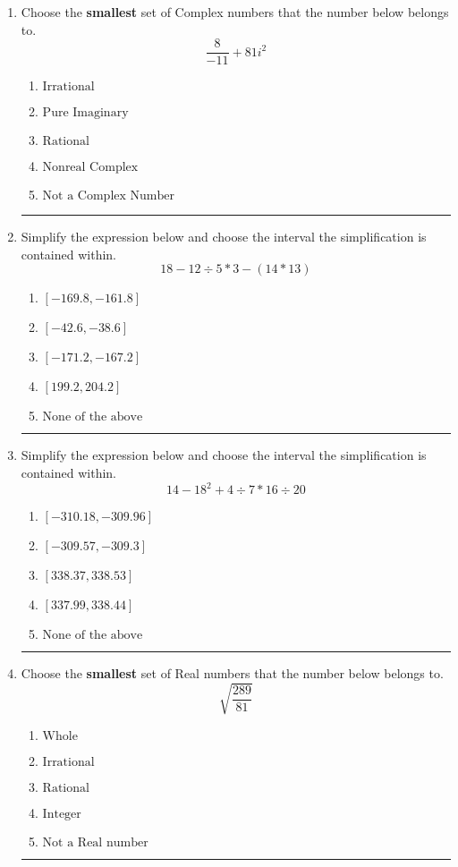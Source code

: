 \documentclass[14pt]{extbook}
\newcommand{\litem}[1]{\item#1\hspace*{-1cm}\rule{\textwidth}{0.4pt}}
\begin{document}
\begin{enumerate}
\litem{
Choose the \textbf{smallest} set of Complex numbers that the number below belongs to.\[ \frac{8}{-11}+81i^2 \]\begin{enumerate}[label=\Alph*.]
\item \( \text{Irrational} \)
\item \( \text{Pure Imaginary} \)
\item \( \text{Rational} \)
\item \( \text{Nonreal Complex} \)
\item \( \text{Not a Complex Number} \)

\end{enumerate} }
\litem{
Simplify the expression below and choose the interval the simplification is contained within.\[ 18 - 12 \div 5 * 3 - (14 * 13) \]\begin{enumerate}[label=\Alph*.]
\item \( [-169.8, -161.8] \)
\item \( [-42.6, -38.6] \)
\item \( [-171.2, -167.2] \)
\item \( [199.2, 204.2] \)
\item \( \text{None of the above} \)

\end{enumerate} }
\litem{
Simplify the expression below and choose the interval the simplification is contained within.\[ 14 - 18^2 + 4 \div 7 * 16 \div 20 \]\begin{enumerate}[label=\Alph*.]
\item \( [-310.18, -309.96] \)
\item \( [-309.57, -309.3] \)
\item \( [338.37, 338.53] \)
\item \( [337.99, 338.44] \)
\item \( \text{None of the above} \)

\end{enumerate} }
\litem{
Choose the \textbf{smallest} set of Real numbers that the number below belongs to.\[ \sqrt{\frac{289}{81}} \]\begin{enumerate}[label=\Alph*.]
\item \( \text{Whole} \)
\item \( \text{Irrational} \)
\item \( \text{Rational} \)
\item \( \text{Integer} \)
\item \( \text{Not a Real number} \)


\end{enumerate}}
\end{enumerate}
\end{document}

